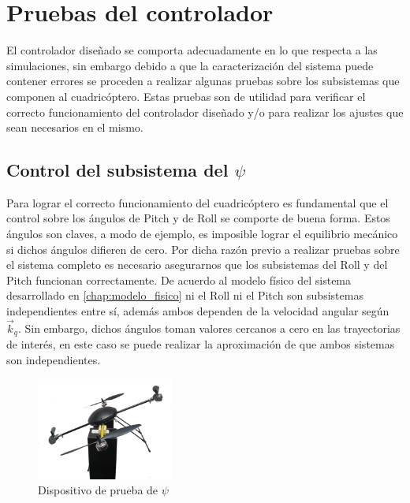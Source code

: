 \documentclass[main]{subfiles}
\begin{document}
\chapter{Pruebas del controlador}
El controlador diseñado se comporta adecuadamente en lo que respecta a las simulaciones, sin embargo debido a que la caracterizaci\'on del sistema puede contener errores se proceden a realizar algunas pruebas sobre los subsistemas que componen al cuadric\'optero. Estas pruebas son de utilidad para verificar el correcto funcionamiento del controlador diseñado y/o para realizar los ajustes que sean necesarios en el mismo.\\

\section{Control del subsistema del $\psi$}

Para lograr el correcto funcionamiento del cuadric\'optero es fundamental que el control sobre los \'angulos de Pitch y de Roll se comporte de buena forma. Estos \'angulos son claves, a modo de ejemplo, es imposible lograr el equilibrio mec\'anico si dichos \'angulos difieren de cero. Por dicha raz\'on previo a realizar pruebas sobre el sistema completo es necesario asegurarnos que los subsistemas del  Roll y del Pitch funcionan correctamente. De acuerdo al modelo f\'isico del sistema desarrollado en \ref{chap:modelo_fisico} ni el Roll ni el Pitch son subsistemas independientes entre s\'i, adem\'as ambos dependen de la velocidad angular seg\'un $\vec{k}_q$. Sin embargo, dichos \'angulos toman valores cercanos a cero en las trayectorias de inter\'es, en este caso se puede realizar la aproximaci\'on de que ambos sistemas son independientes.\\

\begin{figure}
	\vspace{-20pt}
	\centering
	\includegraphics[width=0.4\textwidth]{./pics_test_control/dispositivo_psi.pdf}
	\caption{Dispositivo de prueba de $\psi$}
	\label{fig:psidisp}
\end{figure}
\end{document}
